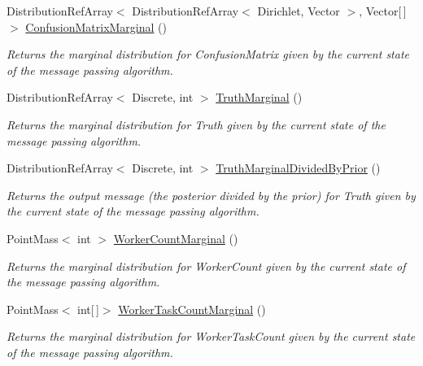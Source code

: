 \begin{DoxyCompactItemize}
Distribution\+Ref\+Array$<$ Distribution\+Ref\+Array$<$ Dirichlet, Vector $>$, Vector\mbox{[}$\,$\mbox{]}$>$ \hyperlink{class_microsoft_research_1_1_infer_1_1_models_1_1_user_1_1_model___e_p_ad8f6e5dd24857fe3d8874e77702f49ae}{Confusion\+Matrix\+Marginal} ()
\begin{DoxyCompactList}\small\item\em Returns the marginal distribution for \textquotesingle{}Confusion\+Matrix\textquotesingle{} given by the current state of the message passing algorithm. \end{DoxyCompactList}\item 
Distribution\+Ref\+Array$<$ Discrete, int $>$ \hyperlink{class_microsoft_research_1_1_infer_1_1_models_1_1_user_1_1_model___e_p_a9f3842349f089d86043d607a831d4307}{Truth\+Marginal} ()
\begin{DoxyCompactList}\small\item\em Returns the marginal distribution for \textquotesingle{}Truth\textquotesingle{} given by the current state of the message passing algorithm. \end{DoxyCompactList}\item 
Distribution\+Ref\+Array$<$ Discrete, int $>$ \hyperlink{class_microsoft_research_1_1_infer_1_1_models_1_1_user_1_1_model___e_p_a100991a01a0141905e4cf5bbab98108e}{Truth\+Marginal\+Divided\+By\+Prior} ()
\begin{DoxyCompactList}\small\item\em Returns the output message (the posterior divided by the prior) for \textquotesingle{}Truth\textquotesingle{} given by the current state of the message passing algorithm. \end{DoxyCompactList}\item 
Point\+Mass$<$ int $>$ \hyperlink{class_microsoft_research_1_1_infer_1_1_models_1_1_user_1_1_model___e_p_a03a6388334755ebd2aa0ff8c5ed1f4e2}{Worker\+Count\+Marginal} ()
\begin{DoxyCompactList}\small\item\em Returns the marginal distribution for \textquotesingle{}Worker\+Count\textquotesingle{} given by the current state of the message passing algorithm. \end{DoxyCompactList}\item 
Point\+Mass$<$ int\mbox{[}$\,$\mbox{]}$>$ \hyperlink{class_microsoft_research_1_1_infer_1_1_models_1_1_user_1_1_model___e_p_a94c95fb366462f663dc702374f1bea44}{Worker\+Task\+Count\+Marginal} ()
\begin{DoxyCompactList}\small\item\em Returns the marginal distribution for \textquotesingle{}Worker\+Task\+Count\textquotesingle{} given by the current state of the message passing algorithm. \end{DoxyCompactList}\item 

\end{DoxyCompactItemize}
